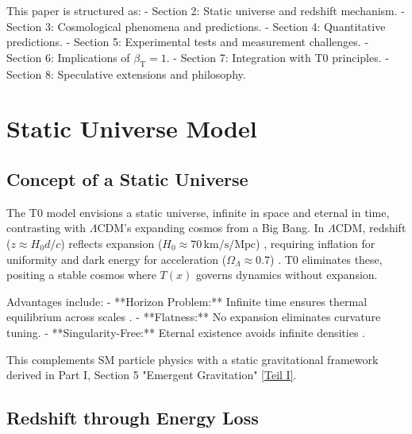 \documentclass[12pt,a4paper]{article}
\newcommand{\Tfield}{T(x)}
\newcommand{\betaT}{\beta_{\text{T}}}
\begin{document}
	This paper is structured as:
	- Section 2: Static universe and redshift mechanism.
	- Section 3: Cosmological phenomena and predictions.
	- Section 4: Quantitative predictions.
	- Section 5: Experimental tests and measurement challenges.
	- Section 6: Implications of \(\betaT = 1\).
	- Section 7: Integration with T0 principles.
	- Section 8: Speculative extensions and philosophy.
	
	\section{Static Universe Model}
	\label{sec:static_universe}
	
	\subsection{Concept of a Static Universe}
	\label{subsec:static_concept}
	
	The T0 model envisions a static universe, infinite in space and eternal in time, contrasting with \(\Lambda\)CDM’s expanding cosmos from a Big Bang. In \(\Lambda\)CDM, redshift (\(z \approx H_0 d / c\)) reflects expansion (\(H_0 \approx 70 \, \text{km/s/Mpc}\)) \cite{Planck2020}, requiring inflation for uniformity and dark energy for acceleration (\(\Omega_{\Lambda} \approx 0.7\)) \cite{Riess1998}. T0 eliminates these, positing a stable cosmos where \(\Tfield\) governs dynamics without expansion.
	
	Advantages include:
	- **Horizon Problem:** Infinite time ensures thermal equilibrium across scales \cite{pascher_messdifferenzen_2025}.
	- **Flatness:** No expansion eliminates curvature tuning.
	- **Singularity-Free:** Eternal existence avoids infinite densities \cite{pascher_perspective_2025}.
	
	This complements SM particle physics with a static gravitational framework derived in Part I, Section 5 "Emergent Gravitation" \href{https://github.com/jpascher/T0-Time-Mass-Duality/tree/main/2/pdf/English/Bridging Quantum Mechanics and Relativity through Time-Mass Duality Part I Theoretical Foundations_en.pdf}{[Teil I]}.
	
	\subsection{Redshift through Energy Loss}
	\label{subsec:redshift_energy_loss}
	
\end{document}
